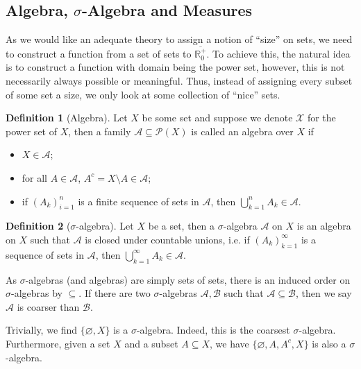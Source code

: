 \documentclass[
]{article}
\theoremstyle{definition}
\theoremstyle{definition}
\newtheorem{definition}{Definition}[section]
\begin{document}
\hypertarget{algebra-sigma-algebra-and-measures}{%
\subsection{\texorpdfstring{Algebra, \(\sigma\)-Algebra and
Measures}{Algebra, \textbackslash sigma-Algebra and Measures}}\label{algebra-sigma-algebra-and-measures}}

As we would like an adequate theory to assign a notion of ``size'' on
sets, we need to construct a function from a set of sets to
\(\overline{\mathbb{R}^+_0}\). To achieve this, the natural idea is to
construct a function with domain being the power set, however, this is
not necessarily always possible or meaningful. Thus, instead of
assigning every subset of some set a size, we only look at some
collection of ``nice'' sets.

\begin{definition}[Algebra]
  Let \(X\) be some set and suppose we denote \(\mathcal{X}\) for the power set of \(X\),
  then a family \(\mathcal{A} \subseteq \mathcal{P}(X)\) is called an algebra 
  over \(X\) if 
  \begin{itemize}
    \item \(X \in \mathcal{A}\);
    \item for all \(A \in \mathcal{A}\), \(A^c = X \setminus A \in \mathcal{A}\);
    \item if \((A_k)_{i = 1}^n\) is a finite sequence of sets in \(\mathcal{A}\), 
      then \(\bigcup_{k = 1}^n A_k \in \mathcal{A}\).
  \end{itemize}
\end{definition}

\begin{definition}[\(\sigma\)-algebra]
  Let \(X\) be a set, then a \(\sigma\)-algebra \(\mathcal{A}\) on \(X\) is an 
  algebra on \(X\) such that \(\mathcal{A}\) is closed under countable unions, 
  i.e. if \((A_k)_{k = 1}^\infty\) is a sequence of sets in \(\mathcal{A}\), 
  then \(\bigcup_{k = 1}^\infty A_k \in \mathcal{A}\).
\end{definition}

As \(\sigma\)-algebras (and algebras) are simply sets of sets, there is
an induced order on \(\sigma\)-algebras by \(\subseteq\). If there are
two \(\sigma\)-algebras \(\mathcal{A}, \mathcal{B}\) such that
\(\mathcal{A} \subseteq \mathcal{B}\), then we say \(\mathcal{A}\) is
coarser than \(\mathcal{B}\).

Trivially, we find \(\{\varnothing, X\}\) is a \(\sigma\)-algebra.
Indeed, this is the coarsest \(\sigma\)-algebra. Furthermore, given a
set \(X\) and a subset \(A \subseteq X\), we have
\(\{\varnothing, A, A^c, X\}\) is also a \(\sigma\)-algebra.
\end{document}
